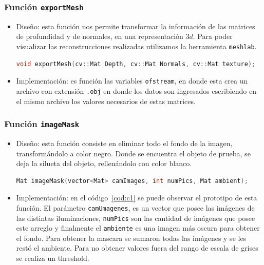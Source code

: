 \documentclass[twocolumn,11pts]{IEEEtran}
\begin{document}
\subsubsection{Función \texttt{exportMesh}}
\begin{itemize}
\item Diseño: esta función nos permite transformar la información de las matrices de profundidad y de normales, en una representación $3d$. Para poder visualizar las reconstrucciones realizadas utilizamos la herramienta \texttt{meshlab}.
\begin{lstlisting}[float,language=C++,caption={Prototipo función \texttt{exportMesh}.},label=cod:c0]
void exportMesh(cv::Mat Depth, cv::Mat Normals, cv::Mat texture);
\end{lstlisting}
\item Implementación: es función las variables \texttt{ofstream}, en donde esta crea un archivo con extensión \texttt{.obj} en donde los datos son ingresados escribiendo en el mismo archivo los valores necesarios de estas matrices.
\end{itemize}
\subsubsection{Función \texttt{imageMask}}
\begin{itemize}
\item Diseño: esta función consiste en eliminar todo el fondo de la imagen, transformándolo a color negro. Donde se encuentra el objeto de prueba, se deja la silueta del objeto, rellenándolo con color blanco.
\begin{lstlisting}[float,language=C++,caption={Prototipo función \texttt{imageMask}.},label=cod:c1]
Mat imageMask(vector<Mat> camImages, int numPics, Mat ambient);
\end{lstlisting}
\item Implementación: en el código~\ref{cod:c1} se puede observar el prototipo de esta función. El parámetro \texttt{camUmagenes}, es un vector que posee las imágenes de las distintas iluminaciones, \texttt{numPics} son las cantidad de imágenes que posee este arreglo y finalmente el \texttt{ambiente} es una imagen más oscura para obtener el fondo. Para obtener la mascara se sumaron todas las imágenes y se les restó el ambiente. Para no obtener valores fuera del rango de escala de grises se realiza un threshold.


\end{itemize}
\end{document}
